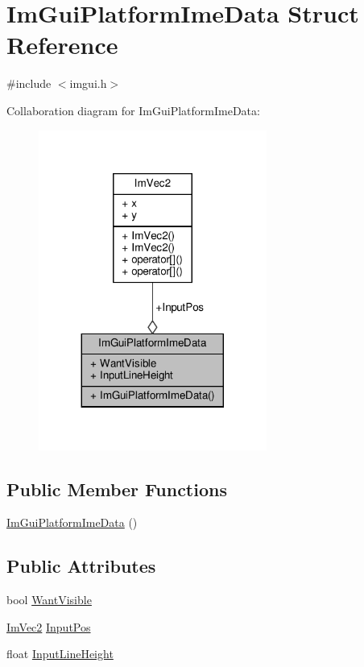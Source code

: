 \hypertarget{structImGuiPlatformImeData}{}\section{Im\+Gui\+Platform\+Ime\+Data Struct Reference}
\label{structImGuiPlatformImeData}


{\ttfamily \#include $<$imgui.\+h$>$}



Collaboration diagram for Im\+Gui\+Platform\+Ime\+Data\+:
\nopagebreak
\begin{figure}[H]
\begin{center}
\leavevmode
\includegraphics[width=212pt]{structImGuiPlatformImeData__coll__graph}
\end{center}
\end{figure}
\subsection*{Public Member Functions}
\begin{DoxyCompactItemize}
\item 
\hyperlink{structImGuiPlatformImeData_a4c632c55f33d8a6c069a8da5dc31a81c}{Im\+Gui\+Platform\+Ime\+Data} ()
\end{DoxyCompactItemize}
\subsection*{Public Attributes}
\begin{DoxyCompactItemize}
\item 
bool \hyperlink{structImGuiPlatformImeData_a92dc237c81108817980aa332bd967d48}{Want\+Visible}
\item 
\hyperlink{structImVec2}{Im\+Vec2} \hyperlink{structImGuiPlatformImeData_a6e3d0f257f1dd4f8cc07eb20dfaddd6b}{Input\+Pos}
\item 
float \hyperlink{structImGuiPlatformImeData_a632e782797251337e8373f2ca6562bc4}{Input\+Line\+Height}
\end{DoxyCompactItemize}


